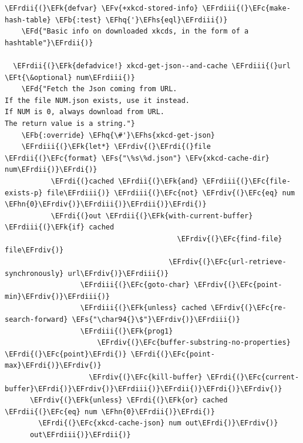 \documentclass{scrartcl}
\newcommand{\EFk}[1]{\textcolor{EFk}{#1}} %
\newcommand{\EFd}[1]{\textcolor{EFd}{#1}} %
\newcommand{\EFt}[1]{\textcolor{EFt}{#1}} %
\newcommand{\EFs}[1]{\textcolor{EFs}{#1}} %
\newcommand{\EFb}[1]{\textcolor{EFb}{#1}} %
\newcommand{\EFc}[1]{\textcolor{EFc}{#1}} %
\newcommand{\EFv}[1]{\textcolor{EFv}{#1}} %
\newcommand{\EFhn}[1]{#1} %
\newcommand{\EFhq}[1]{#1} %
\newcommand{\EFhs}[1]{#1} %
\newcommand{\EFrdi}[1]{#1} %
\newcommand{\EFrdii}[1]{#1} %
\newcommand{\EFrdiii}[1]{#1} %
\newcommand{\EFrdiv}[1]{#1} %
\begin{document}
\begin{Code}
\begin{Verbatim}[]
  \EFrdii{(}\EFk{defvar} \EFv{+xkcd-stored-info} \EFrdiii{(}\EFc{make-hash-table} \EFb{:test} \EFhq{'}\EFhs{eql}\EFrdiii{)}
    \EFd{"Basic info on downloaded xkcds, in the form of a hashtable"}\EFrdii{)}

  \EFrdii{(}\EFk{defadvice!} xkcd-get-json--and-cache \EFrdiii{(}url \EFt{\&optional} num\EFrdiii{)}
    \EFd{"Fetch the Json coming from URL.
If the file NUM.json exists, use it instead.
If NUM is 0, always download from URL.
The return value is a string."}
    \EFb{:override} \EFhq{\#'}\EFhs{xkcd-get-json}
    \EFrdiii{(}\EFk{let*} \EFrdiv{(}\EFrdi{(}file \EFrdii{(}\EFc{format} \EFs{"\%s\%d.json"} \EFv{xkcd-cache-dir} num\EFrdii{)}\EFrdi{)}
           \EFrdi{(}cached \EFrdii{(}\EFk{and} \EFrdiii{(}\EFc{file-exists-p} file\EFrdiii{)} \EFrdiii{(}\EFc{not} \EFrdiv{(}\EFc{eq} num \EFhn{0}\EFrdiv{)}\EFrdiii{)}\EFrdii{)}\EFrdi{)}
           \EFrdi{(}out \EFrdii{(}\EFk{with-current-buffer} \EFrdiii{(}\EFk{if} cached
                                         \EFrdiv{(}\EFc{find-file} file\EFrdiv{)}
                                       \EFrdiv{(}\EFc{url-retrieve-synchronously} url\EFrdiv{)}\EFrdiii{)}
                  \EFrdiii{(}\EFc{goto-char} \EFrdiv{(}\EFc{point-min}\EFrdiv{)}\EFrdiii{)}
                  \EFrdiii{(}\EFk{unless} cached \EFrdiv{(}\EFc{re-search-forward} \EFs{"\char94{}\$"}\EFrdiv{)}\EFrdiii{)}
                  \EFrdiii{(}\EFk{prog1}
                      \EFrdiv{(}\EFc{buffer-substring-no-properties} \EFrdi{(}\EFc{point}\EFrdi{)} \EFrdi{(}\EFc{point-max}\EFrdi{)}\EFrdiv{)}
                    \EFrdiv{(}\EFc{kill-buffer} \EFrdi{(}\EFc{current-buffer}\EFrdi{)}\EFrdiv{)}\EFrdiii{)}\EFrdii{)}\EFrdi{)}\EFrdiv{)}
      \EFrdiv{(}\EFk{unless} \EFrdi{(}\EFk{or} cached \EFrdii{(}\EFc{eq} num \EFhn{0}\EFrdii{)}\EFrdi{)}
        \EFrdi{(}\EFc{xkcd-cache-json} num out\EFrdi{)}\EFrdiv{)}
      out\EFrdiii{)}\EFrdii{)}


\end{Verbatim}
\end{Code}
\end{document}
